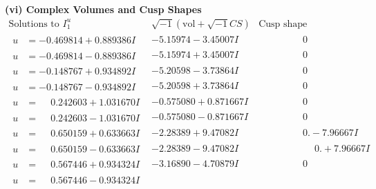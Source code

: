 \documentclass[1p]{elsarticle_modified}
\theoremstyle{definition}
\newcommand{\I}{\sqrt{-1}}
\begin{document}
\newpage\flushleft \textbf{(vi) Complex Volumes and Cusp Shapes}
$$\begin{array}{c|c|c}  
\text{Solutions to }I^u_{1}& \I (\text{vol} + \sqrt{-1}CS) & \text{Cusp shape}\\
 \hline 
\begin{aligned}
u &= -0.469814 + 0.889386 I\end{aligned}
 & -5.15974 - 3.45007 I & \phantom{-0.000000 } 0 \\ \hline\begin{aligned}
u &= -0.469814 - 0.889386 I\end{aligned}
 & -5.15974 + 3.45007 I & \phantom{-0.000000 } 0 \\ \hline\begin{aligned}
u &= -0.148767 + 0.934892 I\end{aligned}
 & -5.20598 - 3.73864 I & \phantom{-0.000000 } 0 \\ \hline\begin{aligned}
u &= -0.148767 - 0.934892 I\end{aligned}
 & -5.20598 + 3.73864 I & \phantom{-0.000000 } 0 \\ \hline\begin{aligned}
u &= \phantom{-}0.242603 + 1.031670 I\end{aligned}
 & -0.575080 + 0.871667 I & \phantom{-0.000000 } 0 \\ \hline\begin{aligned}
u &= \phantom{-}0.242603 - 1.031670 I\end{aligned}
 & -0.575080 - 0.871667 I & \phantom{-0.000000 } 0 \\ \hline\begin{aligned}
u &= \phantom{-}0.650159 + 0.633663 I\end{aligned}
 & -2.28389 + 9.47082 I & \phantom{-0.000000 } 0. - 7.96667 I \\ \hline\begin{aligned}
u &= \phantom{-}0.650159 - 0.633663 I\end{aligned}
 & -2.28389 - 9.47082 I & \phantom{-0.000000 -}0. + 7.96667 I \\ \hline\begin{aligned}
u &= \phantom{-}0.567446 + 0.934324 I\end{aligned}
 & -3.16890 - 4.70879 I & \phantom{-0.000000 } 0 \\ \hline\begin{aligned}
u &= \phantom{-}0.567446 - 0.934324 I\end{aligned}

\end{array}$$
\end{document}
